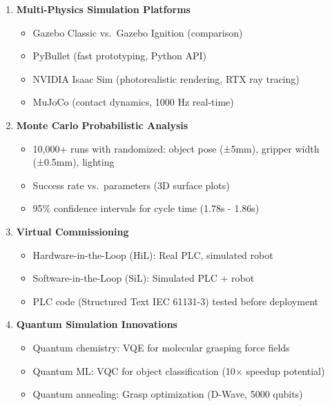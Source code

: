 \documentclass[
]{article}
\providecommand{\tightlist}{%
  \setlength{\itemsep}{0pt}\setlength{\parskip}{0pt}}
\begin{document}
\begin{enumerate}
\def\labelenumi{\arabic{enumi}.}
\setcounter{enumi}{1}
\tightlist
\item
  \textbf{Multi-Physics Simulation Platforms}

  \begin{itemize}
  \tightlist
  \item
    Gazebo Classic vs.~Gazebo Ignition (comparison)
  \item
    PyBullet (fast prototyping, Python API)
  \item
    NVIDIA Isaac Sim (photorealistic rendering, RTX ray tracing)
  \item
    MuJoCo (contact dynamics, 1000 Hz real-time)
  \end{itemize}
\item
  \textbf{Monte Carlo Probabilistic Analysis}

  \begin{itemize}
  \tightlist
  \item
    10,000+ runs with randomized: object pose (±5mm), gripper width
    (±0.5mm), lighting
  \item
    Success rate vs.~parameters (3D surface plots)
  \item
    95\% confidence intervals for cycle time (1.78s - 1.86s)
  \end{itemize}
\item
  \textbf{Virtual Commissioning}

  \begin{itemize}
  \tightlist
  \item
    Hardware-in-the-Loop (HiL): Real PLC, simulated robot
  \item
    Software-in-the-Loop (SiL): Simulated PLC + robot
  \item
    PLC code (Structured Text IEC 61131-3) tested before deployment
  \end{itemize}
\item
  \textbf{Quantum Simulation Innovations}

  \begin{itemize}
  \tightlist
  \item
    Quantum chemistry: VQE for molecular grasping force fields
  \item
    Quantum ML: VQC for object classification (10× speedup potential)
  \item
    Quantum annealing: Grasp optimization (D-Wave, 5000 qubits)
  \end{itemize}
\end{enumerate}
\end{document}
